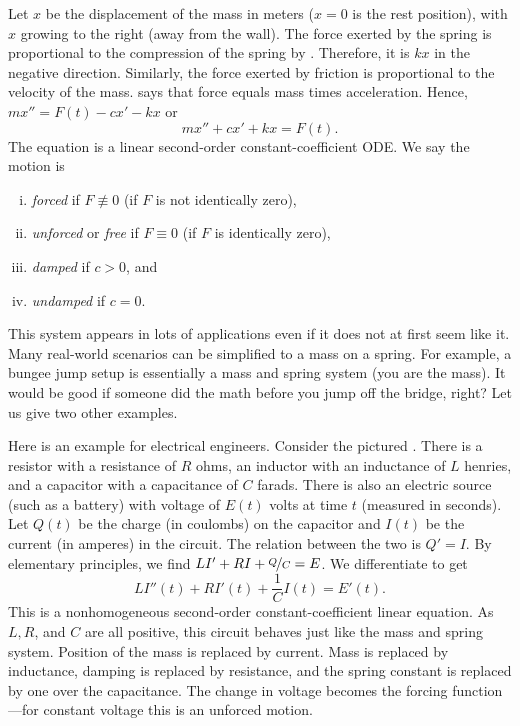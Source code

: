 Let $x$ be the displacement of the mass in meters ($x=0$ is the rest position), with
$x$ growing to the right (away from the wall).
The force exerted by the spring is proportional to the
compression of the spring by .
Therefore, it is $kx$ in the negative direction.
Similarly, the force exerted by friction is proportional
to the velocity of the mass.
 says that force equals mass times
acceleration.
Hence, $mx'' = F(t)-cx'-kx$ or
\begin{equation*}
mx'' + cx' + kx = F(t) .
\end{equation*}
The equation is a linear second-order constant-coefficient ODE\@.
We say the motion is
\begin{enumerate}[(i)]
\item \emph{forced} if $F \not\equiv 0$ (if $F$ is not identically zero),
\item \emph{unforced} or \emph{free} if $F \equiv 0$ (if $F$ is identically zero),
\item \emph{damped} if $c > 0$, and
\item \emph{undamped} if $c = 0$.
\end{enumerate}

This system appears in lots of applications even if it does not at first
seem like it.  Many real-world scenarios can be simplified to
a mass on a spring.  For example, a bungee jump setup is essentially a mass
and spring system (you are the mass).  It would be good if someone did the math
before you jump off the bridge, right?  Let us give two other examples.

\medskip

\begin{mywrapfigsimp}[5]{1.35in}{1.65in}
\noindent
{}
\end{mywrapfigsimp}
Here is an example for electrical engineers.  Consider the
pictured .
There is a resistor with a resistance of $R$ ohms, an
inductor with an inductance of $L$ henries,
and a capacitor with a capacitance of $C$ farads.  There is also
an electric source (such as a battery) with voltage of $E(t)$ volts
at time $t$ (measured in seconds).
Let $Q(t)$ be the charge (in coulombs) on the capacitor
and $I(t)$ be the current (in amperes) in the circuit.  The relation between the two is
$Q' = I$.  By elementary principles, we find 
$L I' + RI + \nicefrac{Q}{C} = E$.   We differentiate to get
\begin{equation*}
L I''(t) + R I'(t) + \frac{1}{C} I(t) = E'(t) .
\end{equation*}
This is a nonhomogeneous second-order constant-coefficient linear equation.
As $L, R$, and $C$ are all positive, this circuit behaves just like the
mass and spring system.  Position of the mass is replaced by current.
Mass is replaced by inductance, damping is replaced by resistance, and
the spring constant is replaced by one over the capacitance.  The change in
voltage becomes the forcing function---for constant voltage this is an
unforced motion.

